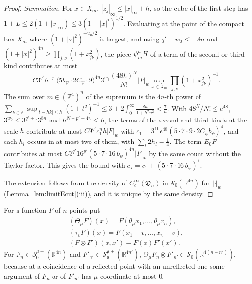 \documentclass[aps,prd,twocolumn,superscriptaddress,nofootinbib,longbibliography,floatfix,amsmath,amssymb,10pt]{revtex4-2}
\theoremstyle{definition}
\theoremstyle{remark}
\newcommand{\R}{\mathbb{R}}
\newcommand{\Z}{\mathbb{Z}}
\begin{document}
\begin{proof}
\emph{Summation.} For $x\in X_m$, $|z_j|_\infty\le|x|_\infty+h$, so the cube
of the first step has $1+L\le2(1+|x|_\infty)\le3(1+|x|^2)^{1/2}$. Evaluating at
the point of the compact box $X_m$ where $(1+|x|^2)^{-w_0/2}$ is largest, and
using $q'-w_0\le-8n$ and $(1+|x|^2)^{4n}\ge\prod_{j,\nu}(1+x_{j\nu}^2)$, the
piece $\psi^h_mH$ of a term of the second or third kind contributes at most
\[
C3^{q'}h^{-p'}\bigl(5b_\psi\cdot2C_\psi\cdot9\bigr)^{4n}3^{w_0}\frac{(48h)^N}
{N!}|F|_w\sup_{x\in X_m}\prod_{j,\nu}(1+x_{j\nu}^2)^{-1} .
\]
The sum over $m\in(\Z^4)^n$ of the supremum is the $4n$-th power of
$\sum_{k\in\Z}\sup_{|t-hk|\le h}(1+t^2)^{-1}\le3+2\int_0^\infty\frac{du}{1+h^2u^2}
<\frac7h$. With $48^N/N!\le e^{48}$, $3^{w_0}\le3^{q'+1}3^{8n}$ and
$h^{N-p'-4n}\le h$, the terms of the second and third kinds at the scale $h$
contribute at most $C9^{q'}c_1^nh|F|_w$ with $c_1=3^{10}e^{48}(5\cdot7\cdot9
\cdot2C_\psi b_\psi)^4$, and each $h_l$ occurs in at most two of them, with
$\sum_l2h_l=\frac14$. The term $E_0F$ contributes at most
$C3^{q'}16^{p'}(5\cdot7\cdot16\,b_\psi)^{4n}|F|_w$ by the same count without
the Taylor factor. This gives the bound with $c_\star=c_1+(5\cdot7\cdot16\,
b_\psi)^4$.

The extension follows from the density of $C^\infty_c(\mathfrak D_n)$ in
$\mathcal S_0(\R^{4n})$ for $|\cdot|_w$ (Lemma~\ref{lem:limitEcut}(iii)), and
it is unique by the same density.
\end{proof}

For a function $F$ of $n$ points put
\begin{gather*}
(\Theta_\mu F)(x)=F(\theta_\mu x_1,\dots,\theta_\mu x_n),\\
(\tau_vF)(x)=F(x_1-v,\dots,x_n-v),\\
(F\otimes F')(x,x')=F(x)F'(x').
\end{gather*}
For $F_n\in\mathcal S^{\mu+}_0(\R^{4n})$
and $F'_{n'}\in\mathcal S^{\mu+}_0(\R^{4n'})$, $\Theta_\mu\bar F_n\otimes
F'_{n'}\in\mathcal S_0(\R^{4(n+n')})$, because at a coincidence of a
reflected point with an unreflected one some argument of $F_n$ or of
$F'_{n'}$ has $\mu$-coordinate at most $0$.
\end{document}
